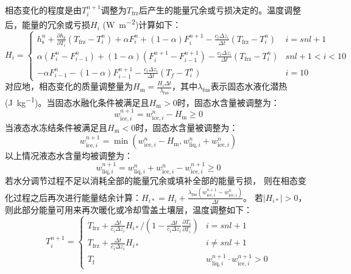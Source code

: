 相态变化的程度是由$T_{i} ^{n+1}$调整为$T_{\mathrm {frz}} $后产生的能量冗余或亏损决定的。温度调整后，能量的冗余或亏损$H_i$ (\unit{W.m^{-2}})计算如下：
\begin{equation}
  H_{i}=\begin{cases}
    h_{\mathrm{s}}^{n}+\frac{\partial h_{\mathrm{s}}}{\partial T_{i}}\left(T_{\mathrm{frz}}-T_{i}^{n}\right)+\alpha F_{i}^{n}+(1-\alpha) F_{i}^{n+1}-\frac{c_{i} \Delta z_{i}}{\Delta t}\left(T_{\mathrm{frz}}-T_{i}^{n}\right) & i=snl+1 \\
    \alpha\left(F_{i}^{n}-F_{i-1}^{n}\right)+(1-\alpha)\left(F_{i}^{n+1}-F_{i-1}^{n+1}\right)-\frac{c_{i} \Delta z_{i}}{\Delta t}\left(T_{\mathrm{frz}}-T_{i}^{n}\right) & snl+1<i<10 \\
    -\alpha F_{i-1}^{n}-(1-\alpha) F_{i-1}^{n+1}-\frac{c_{i} \Delta z_{i}}{\Delta t}\left(T_{f}-T_{i}^{n}\right) & i=10
  \end{cases}
\end{equation}
对应地，相态变化的质量调整量为$H_{\mathrm{m}}=\frac{H_{i} \Delta t}{\lambda_{\mathrm {fus}}}$，其中$\lambda_{\mathrm {fus}} $表示固态水液化潜热(\unit{J.kg^{-1}})。当固态水融化条件被满足且$H_{\mathrm {m}} >0$时，固态水含量被调整为：
\begin{equation}
  w_{\mathrm{ice},i}^{n+1}=w_{\mathrm{ice},i}^{n}-H_{\mathrm{m}} \geqslant 0
\end{equation}
当液态水冻结条件被满足且$H_{\mathrm {m}} <0$时，固态水含量被调整为：
\begin{equation}
  w_{\mathrm{ice},i}^{n+1}=\min{\left(w_{\mathrm{ice},i}^{n}-H_{\mathrm{m}}, w_{\mathrm{liq},i}^{n}+w_{\mathrm{ice},i}^{n}\right)}
\end{equation}
以上情况液态水含量均被调整为：
\begin{equation}
  w_{\mathrm{liq},i}^{n+1}=w_{\mathrm{liq},i}^{n}+w_{\mathrm{ice},i}^{n}-w_{\mathrm{ice},i}^{n+1} \geqslant 0
\end{equation}
若水分调节过程不足以消耗全部的能量冗余或填补全部的能量亏损，
则在相态变化过程之后再次进行能量结余计算：$ H_{i *}=H_{i}+\frac{\lambda_{\mathrm {fus}}\left(w_{\mathrm{ice},i}^{n+1}-w_{\mathrm{ice},i}^{n}\right)}{\Delta t}$。
若$\left|H_{i\ast}\right|>0$，则此部分能量可用来再次暖化或冷却雪盖土壤层，温度调整如下：
\begin{equation}
  T_{i}^{n+1}=\left\{\begin{array}{lr}T_{\mathrm{frz}}+\frac{\Delta t}{c_{i} \Delta z_{i}} H_{i *} /\left(1-\frac{\Delta t}{c_{i} \Delta z_{i}} \frac{\partial T_{\mathrm{s}}}{\partial T_{i}}\right) & i=s n l+1 \\ T_{\mathrm{frz}}+\frac{\Delta t}{c_{i} \Delta z_{i}} H_{i *} & i \neq s n l+1 \\ T_{\mathrm{f}} & w_{\mathrm{liq},i}^{n+1} \cdot w_{\mathrm{ice},i}^{n+1}>0\end{array}\right.
\end{equation}
